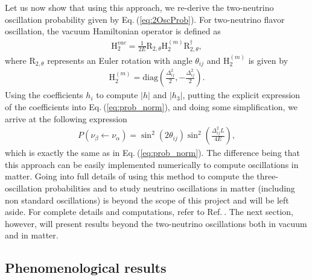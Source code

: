 \documentclass[twocolumn,secnumarabic,amssymb, nobibnotes, aps, prd,10pt]{revtex4-1}
\newcommand{\Eq}[1]{Eq.$\:$(\ref{#1})}
\newcommand{\myref}[1]{Ref.$\:$\cite{#1}}
\begin{document}
Let us now show that using this approach, we re-derive the two-neutrino oscillation
probability given by \Eq{eq:2OscProb}. For two-neutrino flavor oscillation, the vacuum
Hamiltonian operator is defined as
\begin{align}
\mathrm{H}_2^{vac} = \frac{1}{2 E} \mathrm{R}_{2, \theta} \mathrm{H}^{(m)}_2 
\mathrm{R}_{2, \theta}^\dagger ,
\end{align}
where $\mathrm{R}_{2, \theta}$ represents an Euler rotation with angle $\theta_{ij}$
and $\mathrm{H}^{(m)}_2$ is given by 
\begin{align}
\mathrm{H}^{(m)}_2 = \mathrm{diag} \left( \frac{\Delta_{ij}^2}{2}, - \frac{\Delta_{ij}^2}{2} \right). 
\end{align}
Using the coefficients $h_i$ to compute $\vert h \vert$ and $\vert h_3 \vert$, putting 
the explicit expression of the coefficients into \Eq{eq:prob_norm}, and doing some 
simplification, we arrive at the following expression
\begin{align}
P (\nu_\beta \longleftarrow \nu_\alpha) = \sin^2 (2 \theta_{ij}) \sin^2 \left(
\frac{\Delta_{ij}^2 L}{4 E} \right) ,
\end{align} 
which is exactly the same as in \Eq{eq:prob_norm}. The difference being that this approach
can be easily implemented numerically to compute oscillations in matter. Going into full
details of using this method to compute the three-oscillation probabilities and to study
neutrino oscillations in matter (including non standard oscillations) is beyond the scope of 
this project and will be left aside. For complete details and computations, refer to 
\myref{Bustamante:2019ggq}. The next section, however, will present results beyond the 
two-neutrino oscillations both in vacuum and in matter.


\subsection{Phenomenological results}
\label{subsec:results}
\end{document}
